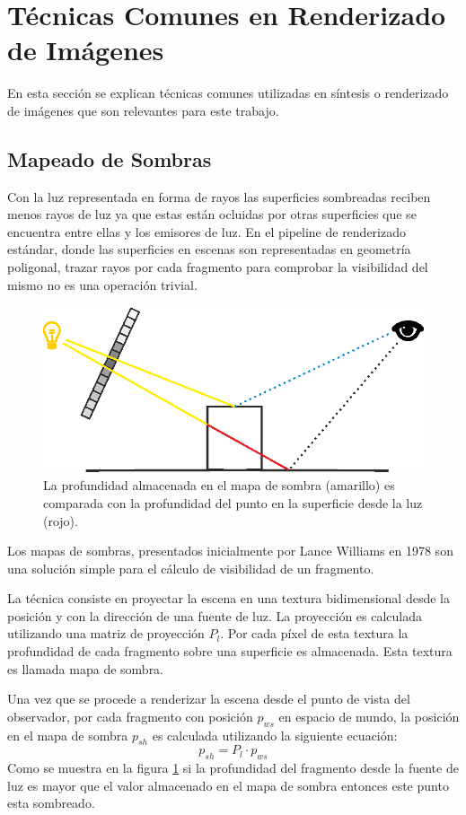 \section{Técnicas Comunes en Renderizado de Imágenes}

En esta sección se explican técnicas comunes utilizadas en síntesis o renderizado de imágenes que son relevantes para este trabajo.
\subsection{Mapeado de Sombras}
\label{subsec:shadowmapping}
Con la luz representada en forma de rayos las superficies sombreadas reciben menos rayos de luz ya que estas están ocluidas por otras superficies que se encuentra entre ellas y los emisores de luz. En el pipeline de renderizado estándar, donde las superficies en escenas son representadas en geometría poligonal, trazar rayos por cada fragmento para comprobar la visibilidad del mismo no es una operación trivial.
\begin{figure}[H]
	\centering
	\includegraphics[width=0.85\linewidth]{media/shadow_mapping.eps}
	\caption{La profundidad almacenada en el mapa de sombra (amarillo) es comparada con la profundidad del punto en la superficie desde la luz (rojo).}
	\label{fig:shadow_mapping}
\end{figure}
Los mapas de sombras, presentados inicialmente por Lance Williams en 1978 \cite{Williams:78} son una solución simple para el cálculo de visibilidad de un fragmento.

La técnica consiste en proyectar la escena en una textura bidimensional desde la posición y con la dirección de una fuente de luz. La proyección es calculada utilizando una matriz de proyección $P_{l}$. Por cada píxel de esta textura la profundidad de cada fragmento sobre una superficie es almacenada. Esta textura es llamada mapa de sombra.

Una vez que se procede a renderizar la escena desde el punto de vista del observador, por cada fragmento con posición $p_{ws}$ en espacio de mundo, la posición en el mapa de sombra $p_{sh}$ es calculada utilizando la siguiente ecuación:
\begin{equation}
    p_{sh} = P_{l} \cdot p_{ws}
    \label{eq:p_to_shadowmap}
\end{equation}
Como se muestra en la figura \ref{fig:shadow_mapping} si la profundidad del fragmento desde la fuente de luz es mayor que el valor almacenado en el mapa de sombra entonces este punto esta sombreado. 

